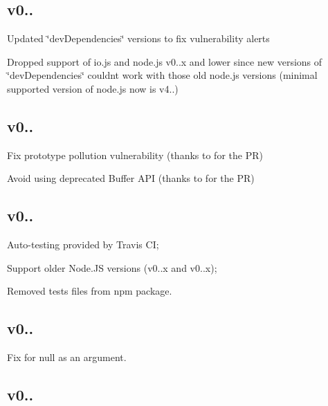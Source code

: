 \subsection*{v0.. }


\begin{DoxyItemize}
\item Updated \char`\"{}dev\+Dependencies\char`\"{} versions to fix vulnerability alerts
\item Dropped support of io.\+js and node.\+js v0..\+x and lower since new versions of \char`\"{}dev\+Dependencies\char`\"{} couldn\textquotesingle{}t work with those old node.\+js versions (minimal supported version of node.\+js now is v4..)
\end{DoxyItemize}

\subsection*{v0.. }


\begin{DoxyItemize}
\item Fix prototype pollution vulnerability (thanks to  for the PR)
\item Avoid using deprecated Buffer A\+PI (thanks to  for the PR)
\end{DoxyItemize}

\subsection*{v0.. }


\begin{DoxyItemize}
\item Auto-\/testing provided by Travis CI;
\item Support older Node.\+JS versions ({\ttfamily v0..\+x} and {\ttfamily v0..\+x});
\item Removed tests files from npm package.
\end{DoxyItemize}

\subsection*{v0.. }


\begin{DoxyItemize}
\item Fix for {\ttfamily null} as an argument.
\end{DoxyItemize}

\subsection*{v0.. }


